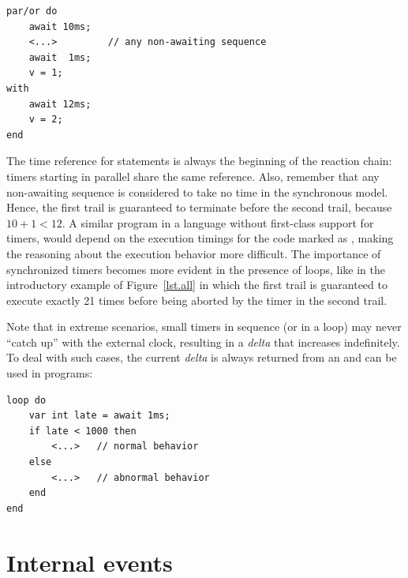 \nopagebreak
\noindent
\begin{minipage}{\linewidth}
\begin{lstlisting}[xleftmargin=2em]
par/or do
    await 10ms;
    <...>         // any non-awaiting sequence
    await  1ms;
    v = 1;
with
    await 12ms;
    v = 2;
end
\end{lstlisting}
\end{minipage}

The time reference for  statements is always the beginning of the 
reaction chain: timers starting in parallel share the same reference.
Also, remember that any non-awaiting sequence is considered to take no time in 
the synchronous model.
Hence, the first trail is guaranteed to terminate before the second trail, 
because $10+1 < 12$.
A similar program in a language without first-class support for timers, would 
depend on the execution timings for the code marked as , making the 
reasoning about the execution behavior more difficult.
%
The importance of synchronized timers becomes more evident in the presence of 
loops, like in the introductory example of Figure~\ref{lst.all} in which the 
first trail is guaranteed to execute exactly 21 times before being aborted by 
the timer in the second trail.

Note that in extreme scenarios, small timers in sequence (or in a loop) may 
never ``catch up'' with the external clock, resulting in a \emph{delta} that
increases indefinitely.
To deal with such cases, the current \emph{delta} is always returned from an 
 and can be used in programs:

\begin{lstlisting}
loop do
    var int late = await 1ms;
    if late < 1000 then
        <...>   // normal behavior
    else
        <...>   // abnormal behavior
    end
end
\end{lstlisting}


\section{Internal events}
\label{sec.ceu.ints}

